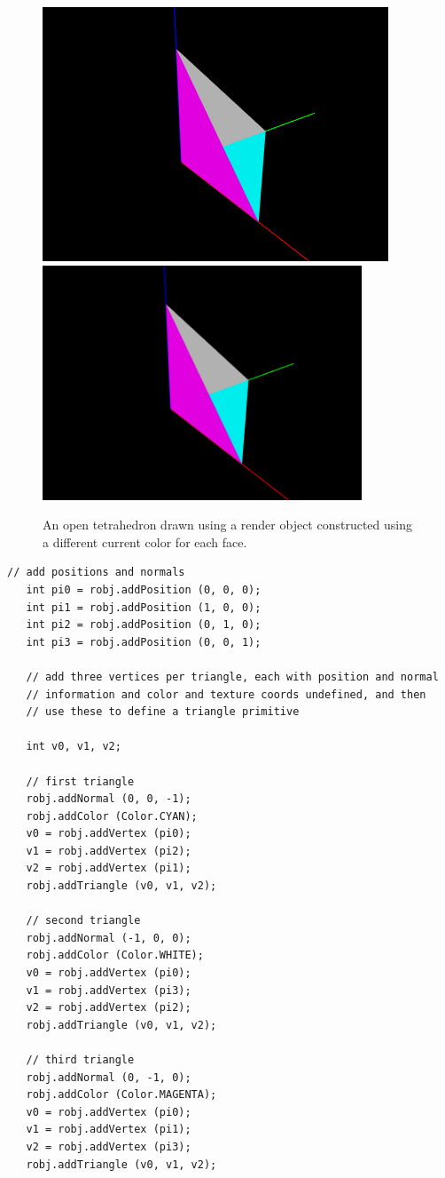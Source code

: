 \begin{figure}[t]
\begin{center}
\iflatexml
 \includegraphics[]{images/coloredRenderObjTet}
\else
 \includegraphics[width=3.75in]{images/coloredRenderObjTet}
\fi
\end{center}
\caption{An open tetrahedron drawn using a render object constructed
using a different current color for each face.}
\label{coloredRenderObjTet:fig}
\end{figure}
%
\begin{lstlisting}[caption={Constructing a render object using current normals
and colors.},label=renderObjNormalsColors:lst]
   // add positions and normals
   int pi0 = robj.addPosition (0, 0, 0);
   int pi1 = robj.addPosition (1, 0, 0);
   int pi2 = robj.addPosition (0, 1, 0);
   int pi3 = robj.addPosition (0, 0, 1);

   // add three vertices per triangle, each with position and normal
   // information and color and texture coords undefined, and then
   // use these to define a triangle primitive

   int v0, v1, v2;

   // first triangle
   robj.addNormal (0, 0, -1);
   robj.addColor (Color.CYAN);
   v0 = robj.addVertex (pi0);
   v1 = robj.addVertex (pi2);
   v2 = robj.addVertex (pi1);
   robj.addTriangle (v0, v1, v2);

   // second triangle
   robj.addNormal (-1, 0, 0);
   robj.addColor (Color.WHITE);
   v0 = robj.addVertex (pi0);
   v1 = robj.addVertex (pi3);
   v2 = robj.addVertex (pi2);
   robj.addTriangle (v0, v1, v2);

   // third triangle
   robj.addNormal (0, -1, 0);
   robj.addColor (Color.MAGENTA);
   v0 = robj.addVertex (pi0);
   v1 = robj.addVertex (pi1);
   v2 = robj.addVertex (pi3);
   robj.addTriangle (v0, v1, v2);
\end{lstlisting}

